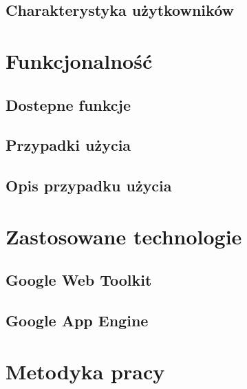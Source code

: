 \documentclass{pracamgr}
\begin{document}
\section{Charakterystyka użytkowników}



\chapter{Funkcjonalność}
\section{Dostepne funkcje}

\section{Przypadki użycia}

\section{Opis przypadku użycia}


\chapter{Zastosowane technologie}
\section{Google Web Toolkit}
\section{Google App Engine}


\chapter{Metodyka pracy}
\end{document}
